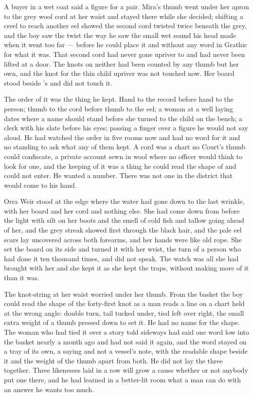 A buyer in a wet coat said a figure for a pair. Mira's thumb went under her apron to the grey wool cord at her waist and stayed there while she decided; shifting a creel to reach another eel showed the second cord twisted twice beneath the grey, and the boy saw the twist the way he saw the small wet sound his head made when it went too far --- before he could place it and without any word in Grathic for what it was. That second cord had never gone upriver to  and had never been lifted at a door. The knots on neither had been counted by any thumb but her own, and the knot for the thin child upriver was not touched now. Her board stood beside 's  and did not touch it.

The order of it was the thing he kept. Hand to the record before hand to the person; thumb to the cord before thumb to the eel; a woman at a well laying dates where a name should stand before she turned to the child on the bench; a clerk with his slate before his eyes;  passing a finger over a figure he would not say aloud. He had watched the order in five rooms now and had no word for it and no standing to ask what any of them kept. A cord was a chart no Court's thumb could confiscate, a private account sewn in wool where no officer would think to look for one, and the keeping of it was a thing he could read the shape of and could not enter. He wanted a number. There was not one in the district that would come to his hand.

\scenebreak

Orra Weir stood at the edge where the water had gone down to the last wrinkle, with her board and her cord and nothing else. She had come down from  before the light with silt on her boots and the smell of cold fish and tallow going ahead of her, and the grey streak showed first through the black hair, and the pale eel scars lay uncovered across both forearms, and her hands were like old rope. She set the board on its side and turned it with her wrist, the turn of a person who had done it ten thousand times, and did not speak. The watch was all she had brought with her and she kept it as she kept the traps, without making more of it than it was.

The knot-string at her waist worried under her thumb. From the basket the boy could read the shape of the forty-first knot as a man reads a line on a chart held at the wrong angle: double turn, tail tucked under, tied left over right, the small extra weight of a thumb pressed down to set it. He had no name for the shape. The woman who had tied it over a story told sideways had said one word low into the basket nearly a month ago and had not said it again, and the word stayed on a tray of its own, a saying and not a vessel's note, with the readable shape beside it and the weight of the thumb apart from both. He did not lay the three together. Three likenesses laid in a row will grow a cause whether or not anybody put one there, and he had learned in a better-lit room what a man can do with an answer he wants too much.

